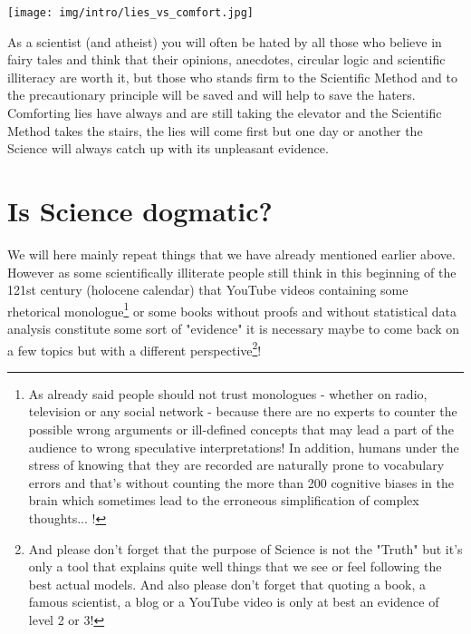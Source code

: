 	\begin{center}
		\texttt{[image: img/intro/lies\_vs\_comfort.jpg]}	
	\end{center}
	\begin{fquote}As a scientist (and atheist) you will often be hated by all those who believe in fairy tales and think that their opinions, anecdotes, circular logic and scientific illiteracy are worth it, but those who stands firm to the Scientific Method and to the precautionary principle will be saved and will help to save the haters. Comforting lies have always and are still taking the elevator and the Scientific Method takes the stairs, the lies will come first but one day or another the Science will always catch up with its unpleasant evidence.
 	\end{fquote}
	
	\pagebreak
	\section{Is Science dogmatic?}
	We will here mainly repeat things that we have already mentioned earlier above. However as some scientifically illiterate people still think in this beginning of the 121st century (holocene calendar) that YouTube videos containing some rhetorical monologue\footnote{As already said people should not trust monologues - whether on radio, television or any social network - because there are no experts to counter the possible wrong arguments or ill-defined concepts that may lead a part of the audience to wrong speculative interpretations! In addition, humans under the stress of knowing that they are recorded are naturally prone to vocabulary errors and that's without counting the more than 200 cognitive biases in the brain which sometimes lead to the erroneous simplification of complex thoughts... !} or some books without proofs and without statistical data analysis constitute some sort of "evidence" it is necessary maybe to come back on a few topics but with a different perspective\footnote{And please don't forget that the purpose of Science is not the "Truth" but it's only a tool that explains quite well things that we see or feel following the best actual models. And also please don't forget that quoting a book, a famous scientist, a blog or a YouTube video is only at best an evidence of level 2 or 3!}!
	
